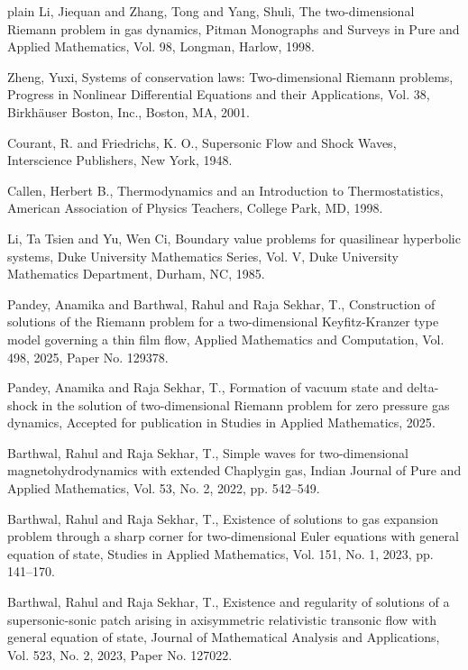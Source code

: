 \documentclass[3p,11pt]{elsarticle}
\numberwithin{equation}{section}
\begin{document}
\begin{thebibliography}{plain}
{Li, Jiequan and Zhang, Tong and Yang, Shuli,
The two-dimensional Riemann problem in gas dynamics,
Pitman Monographs and Surveys in Pure and Applied Mathematics, Vol. 98,
Longman, Harlow, 1998}.

{Zheng, Yuxi,
Systems of conservation laws: Two-dimensional Riemann problems,
Progress in Nonlinear Differential Equations and their Applications, Vol. 38,
Birkh\"auser Boston, Inc., Boston, MA, 2001}.

{Courant, R. and Friedrichs, K. O.,
Supersonic Flow and Shock Waves,
Interscience Publishers, New York, 1948}.

{Callen, Herbert B.,
Thermodynamics and an Introduction to Thermostatistics,
American Association of Physics Teachers, College Park, MD, 1998}.

{Li, Ta Tsien and Yu, Wen Ci,
Boundary value problems for quasilinear hyperbolic systems,
Duke University Mathematics Series, Vol. V,
Duke University Mathematics Department, Durham, NC, 1985}.

{Pandey, Anamika and Barthwal, Rahul and Raja Sekhar, T.,
Construction of solutions of the Riemann problem for a two-dimensional Keyfitz-Kranzer type model governing a thin film flow,
Applied Mathematics and Computation, Vol. 498, 2025, Paper No. 129378}.

{Pandey, Anamika and Raja Sekhar, T.,
Formation of vacuum state and delta-shock in the solution of two-dimensional Riemann problem for zero pressure gas dynamics, Accepted for publication in Studies in Applied Mathematics, 2025}.

{Barthwal, Rahul and Raja Sekhar, T.,
Simple waves for two-dimensional magnetohydrodynamics with extended Chaplygin gas,
Indian Journal of Pure and Applied Mathematics, Vol. 53, No. 2, 2022, pp. 542--549}.

{Barthwal, Rahul and Raja Sekhar, T.,
Existence of solutions to gas expansion problem through a sharp corner for two-dimensional Euler equations with general equation of state,
Studies in Applied Mathematics, Vol. 151, No. 1, 2023, pp. 141--170}.

{Barthwal, Rahul and Raja Sekhar, T.,
Existence and regularity of solutions of a supersonic-sonic patch arising in axisymmetric relativistic transonic flow with general equation of state,
Journal of Mathematical Analysis and Applications, Vol. 523, No. 2, 2023, Paper No. 127022}.


\end{thebibliography}
\end{document}
